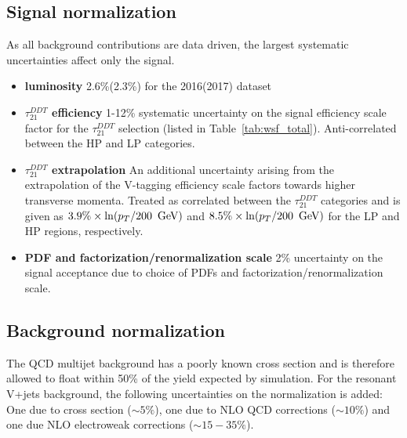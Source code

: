 \subsection{Signal normalization}
As all background contributions are data driven, the largest systematic uncertainties affect only the signal.
\begin{itemize}
\item {\bf luminosity } 2.6\%(2.3\%) for the 2016(2017) dataset
\item {\bf $\tau_{21}^{DDT}$ efficiency } 1-12\% systematic uncertainty on the signal efficiency scale factor for the $\tau_{21}^{DDT}$ selection (listed in Table~\ref{tab:wsf_total}). Anti-correlated between the HP and LP categories.
\item {\bf $\tau_{21}^{DDT}$ \PT{} extrapolation } An additional uncertainty arising from the extrapolation of the V-tagging efficiency scale factors towards higher transverse momenta. Treated as correlated between the $\tau_{21}^{DDT}$ categories and is given as $3.9\% \times \ln(p_T/200~\,\text{Ge\hspace{-.08em}V})$ and $8.5\% \times \ln(p_T/200~\,\text{Ge\hspace{-.08em}V})$ for the LP and HP regions, respectively. 
\item {\bf PDF and factorization/renormalization scale } 2\% uncertainty on the signal acceptance due to choice of PDFs and factorization/renormalization scale. 
\end{itemize} 


\subsection{Background normalization}
The QCD multijet background has a poorly known cross section and is therefore allowed to float within 50\% of the yield expected by simulation. For the resonant V+jets background, the following uncertainties on the normalization is added: One due to cross section ($\sim5\%$), one due to NLO QCD corrections ($\sim10\%$) and one due NLO electroweak corrections ($\sim15-35\%$).

